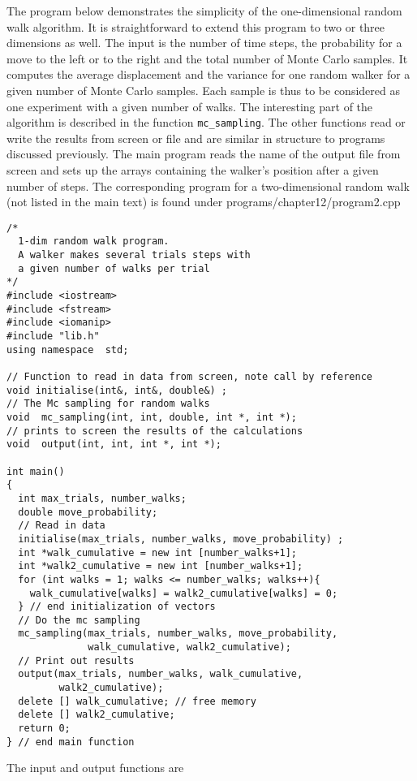 The program below demonstrates the simplicity of the one-dimensional random walk algorithm.
It is straightforward to extend this program to two or three dimensions as well.
The input is the number of time steps, the probability for a move to the left or to the right
and the total number of Monte Carlo samples. It computes the average displacement and the variance
for one random walker for a given number of Monte Carlo samples. Each sample is thus to be 
considered as one experiment with a given number of walks.
The interesting part of the algorithm is described in the 
function \lstinline{mc_sampling}. The other functions read or write the results from screen or file
and are similar in structure to programs discussed previously.
The main program reads the name of the output file from screen and sets up the arrays
containing the walker's position after a given number of steps. The corresponding program for a two-dimensional
random walk (not listed in the main text) is found under programs/chapter12/program2.cpp
\begin{lstlisting}[title={\url{http://folk.uio.no/mhjensen/compphys/programs/chapter12/cpp/program1.cpp}}]
/*
  1-dim random walk program. 
  A walker makes several trials steps with
  a given number of walks per trial
*/
#include <iostream>
#include <fstream>
#include <iomanip>
#include "lib.h"
using namespace  std;

// Function to read in data from screen, note call by reference
void initialise(int&, int&, double&) ;
// The Mc sampling for random walks
void  mc_sampling(int, int, double, int *, int *);
// prints to screen the results of the calculations 
void  output(int, int, int *, int *);

int main()
{
  int max_trials, number_walks; 
  double move_probability;
  // Read in data 
  initialise(max_trials, number_walks, move_probability) ;
  int *walk_cumulative = new int [number_walks+1];
  int *walk2_cumulative = new int [number_walks+1];
  for (int walks = 1; walks <= number_walks; walks++){   
    walk_cumulative[walks] = walk2_cumulative[walks] = 0;
  } // end initialization of vectors
  // Do the mc sampling  
  mc_sampling(max_trials, number_walks, move_probability, 
              walk_cumulative, walk2_cumulative);
  // Print out results 
  output(max_trials, number_walks, walk_cumulative, 
         walk2_cumulative);
  delete [] walk_cumulative; // free memory
  delete [] walk2_cumulative; 
  return 0; 
} // end main function
\end{lstlisting}
The  input and output functions are 
